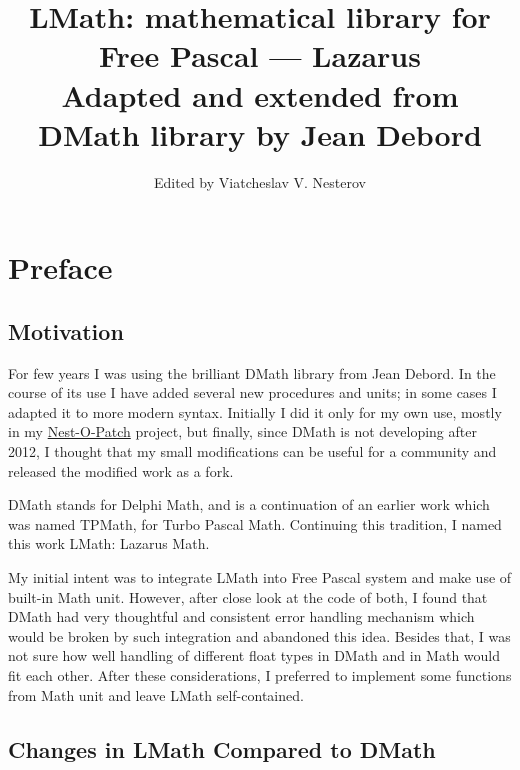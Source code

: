 \documentclass[12pt,a4paper,oneside]{report}
\begin{document}
\title{LMath: mathematical library for Free Pascal --- Lazarus\\
{\large Adapted and extended from DMath library by Jean Debord}}

\author{Edited by Viatcheslav V. Nesterov}
\maketitle
\newpage
\label{toc}\tableofcontents
\newpage
\newlength{\tmplength}
\chapter*{Preface}
\section*{Motivation}
For few years I was using the brilliant DMath library from Jean Debord. In the course of its use I have added several new procedures and units; in some cases I adapted it to more modern syntax. Initially I did it only for my own use, mostly in my \href{https://sourceforge.net/projects/nestopatch/}{Nest-O-Patch} project, but finally, since DMath is not developing after 2012, I thought that my small modifications can be useful for a community and released the modified work as a fork. 

DMath stands for Delphi Math, and is a continuation of an earlier work which was named TPMath, for Turbo Pascal Math. Continuing this tradition, I named this work LMath: Lazarus Math.

My initial intent was to integrate LMath into Free Pascal system and make use of built-in Math unit. However, after close look at the code of both, I found that DMath had very thoughtful and consistent error handling mechanism which would be broken by such integration and abandoned this idea. Besides that, I was not sure how well handling of different float types in DMath and in Math would fit each other. After these considerations, I preferred to implement some functions from Math unit and leave LMath self-contained.
\section*{Changes in LMath Compared to DMath}
\end{document}
